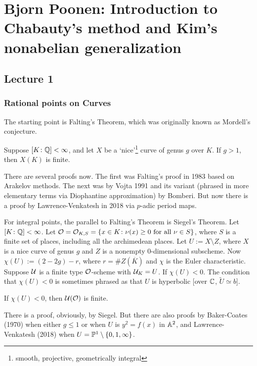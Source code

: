 \newpage
\section{Bjorn Poonen: Introduction to Chabauty's method and Kim's nonabelian generalization}
\subsection{Lecture 1}
\subsubsection{Rational points on Curves}

The starting point is Falting's Theorem, which was originally known as Mordell's conjecture.

\begin{thm}[Falting's, 1983]
Suppose $[K \colon \Q] < \infty$, and let $X$ be a `nice'\footnote{smooth, projective, geometrically integral} curve of genus $g$ over $K$. If $g>1$, then $X(K)$ is finite. 
\end{thm}


There are several proofs now. The first was Falting's proof in 1983 based on Arakelov methods. The next was by Vojta 1991 and its variant (phrased in more elementary terms via Diophantine approximation) by Bomberi. But now there is a proof by Lawrence-Venkatesh in 2018 via $p$-adic period maps. 


For integral points, the parallel to Falting's Theorem is Siegel's Theorem. Let $[K \colon \Q] < \infty$. Let $\O= \O_{K,S}= \{ x \in K \colon \nu(x) \geq 0 \text{ for all } \nu \in S \}$, where $S$ is a finite set of places, including all the archimedean places. Let $U:= X \setminus Z$, where $X$ is a nice curve of genus $g$ and $Z$ is a nonempty 0-dimensional subscheme. Now $\chi(U):= (2-2g) - r$, where $r= \#Z(\overline{K})$ and $\chi$ is the Euler characteristic. Suppose $\cU$ is a finite type $\O$-scheme with $\cU_K= U$. If $\chi(U)< 0$. The condition that $\chi(U)<0$ is sometimes phrased as that $U$ is hyperbolic [over $\C$, $\widetilde{U} \simeq b$]. 


\begin{thm}
If $\chi(U)< 0$, then $\cU(\O)$ is finite. 
\end{thm}


There is a proof, obviously, by Siegel. But there are also proofs by Baker-Coates (1970) when either $g \leq 1$ or when $U$ is $y^2= f(x)$ in $\A^2$, and Lawrence-Venkatesh (2018) when $U= \P^1 \setminus \{0,1,\infty\}$. 


